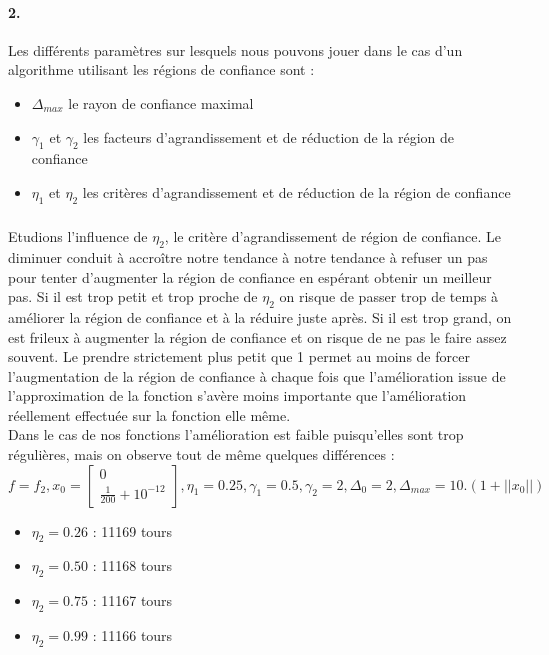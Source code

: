 \documentclass[12pt]{article}	%
\begin{document}
\paragraph{2.}
Les différents paramètres sur lesquels nous pouvons jouer dans le cas d'un algorithme utilisant les régions de confiance sont :
\begin{itemize}
	\item $\Delta_{max}$ le rayon de confiance maximal
	\item $\gamma_1$ et $\gamma_2$ les facteurs d'agrandissement et de réduction de la région de confiance
	\item $\eta_1$ et $\eta_2$ les critères d'agrandissement et de réduction de la région de confiance
\end{itemize}
\subparagraph{}
Etudions l'influence de $\eta_2$, le critère d'agrandissement de région de confiance. Le diminuer conduit à accroître notre tendance à notre tendance à refuser un pas pour tenter d'augmenter la région de confiance en espérant obtenir un meilleur pas. Si il est trop petit et trop proche de $\eta_2$ on risque de passer trop de temps à améliorer la région de confiance et à la réduire juste après. Si il est trop grand, on est frileux à augmenter la région de confiance et on risque de ne pas le faire assez souvent. Le prendre strictement plus petit que 1 permet au moins de forcer l'augmentation de la région de confiance à chaque fois que l'amélioration issue de l'approximation de la fonction s'avère moins importante que l'amélioration réellement effectuée sur la fonction elle même.
\\
Dans le cas de nos fonctions l'amélioration est faible puisqu'elles sont trop régulières, mais on observe tout de même quelques différences :
	\[f = f_2, x_0 = \left[\begin{array}{c}0\\\frac{1}{200}+10^{-12}\end{array}\right], \eta_1 = 0.25, \gamma_1 = 0.5, \gamma_2 = 2, \Delta_0 = 2, \Delta_{max} = 10.(1 + ||x_0||)\]
\begin{itemize}
	\item $\eta_2 = 0.26$ : 11169 tours
	\item $\eta_2 = 0.50$ : 11168 tours
	\item $\eta_2 = 0.75$ : 11167 tours
	\item $\eta_2 = 0.99$ : 11166 tours
\end{itemize}
\end{document}

